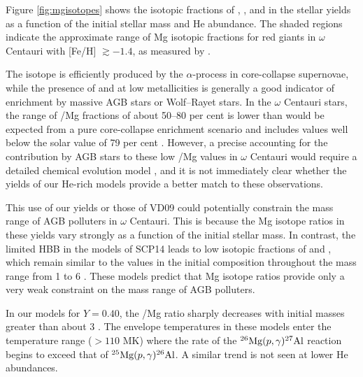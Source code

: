 Figure \ref{fig:mgisotopes} shows the isotopic fractions of , , and  in the stellar yields as a function of the initial stellar mass and He abundance. The shaded regions indicate the approximate range of Mg isotopic fractions for red giants in $\omega$ Centauri with [Fe/H] $\gtrsim -1.4$, as measured by \citet{DaCosta:2013cf}.

The isotope  is efficiently produced by the $\alpha$-process in core-collapse supernovae, while the presence of  and  at low metallicities is generally a good indicator of enrichment by massive AGB stars or Wolf--Rayet stars. In the $\omega$ Centauri stars, the range of /Mg fractions of about 50--80 per cent is lower than would be expected from a pure core-collapse enrichment scenario  \citep[e.g., $\gtrsim 90$ per cent for the low-metallicity yields of][]{Kobayashi:2011hj} and includes values well below the solar value of 79 per cent \citep{Asplund:2009eu}. However, a precise accounting for the contribution by AGB stars to these low /Mg values in $\omega$ Centauri would require a detailed chemical evolution model \citep[e.g.,][]{Romano:2007ks}, and it is not immediately clear whether the yields of our He-rich models provide a better match to these observations.

This use of our yields or those of VD09 could potentially constrain the mass range of AGB polluters in $\omega$ Centauri. This is because the Mg isotope ratios in these yields vary strongly as a function of the initial stellar mass. In contrast, the limited HBB in the models of SCP14 leads to low isotopic fractions of  and , which remain similar to the values in the initial composition throughout the mass range from 1 to 6 \Msun. These models predict that Mg isotope ratios provide only a very weak constraint on the mass range of AGB polluters.

In our models for $Y=0.40$, the /Mg ratio sharply decreases with initial masses greater than about 3 \Msun. The envelope temperatures in these models enter the temperature range ($> 110$ MK) where the rate of the $\mbox{${}^{26}{\text{Mg}}$}(p,\gamma)\mbox{${}^{27}{\text{Al}}$}$ reaction begins to exceed that of $\mbox{${}^{25}{\text{Mg}}$}(p,\gamma)\mbox{${}^{26}{\text{Al}}$}$. A similar trend is not seen at lower He abundances.

